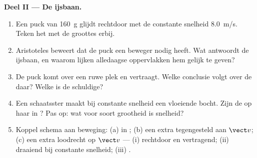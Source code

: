 \begin{problem}
\medskip
\noindent\textbf{Deel II --- De ijsbaan.}
\begin{enumerate}[resume]
  \item Een puck van \qty{160}{g} glijdt rechtdoor met de constante
        snelheid \qty{8.0}{m/s}. Teken het  met de
        groottes erbij.
  \item Aristoteles beweert dat de puck een beweger nodig heeft. Wat
        antwoordt de ijsbaan, en waarom lijken alledaagse oppervlakken
        hem gelijk te geven?
  \item De puck komt over een ruwe plek en vertraagt. Welke conclusie
        volgt over de  daar? Welke  is de schuldige?
  \item Een schaatsster maakt bij constante snelheid een vloeiende
        bocht. Zijn de  op haar in ? Pas op: wat voor
        soort grootheid is snelheid?
  \item Koppel schema aan beweging: (a)  in ; (b) een
        extra  tegengesteld aan $\vect v$; (c) een extra 
        loodrecht op $\vect v$ --- (i) rechtdoor en vertragend; (ii)
        draaiend bij constante snelheid; (iii) .
\end{enumerate}


\end{problem}
